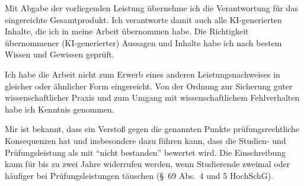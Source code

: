 {{Mit Abgabe der vorliegenden Leistung übernehme ich die Verantwortung für das eingereichte Gesamtprodukt. Ich verantworte damit auch alle KI-generierten Inhalte, die ich in meine Arbeit übernommen habe. Die Richtigkeit übernommener (KI-generierter) Aussagen und Inhalte habe ich nach bestem Wissen und Gewissen geprüft.
    
Ich habe die Arbeit nicht zum Erwerb eines anderen Leistungsnachweises in gleicher oder ähnlicher Form eingereicht. Von der Ordnung zur Sicherung guter wissenschaftlicher Praxis und zum Umgang mit wissenschaftlichem Fehlverhalten habe ich Kenntnis genommen.
    
Mir ist bekannt, dass ein Verstoß gegen die genannten Punkte prüfungsrechtliche Konsequenzen hat und insbesondere dazu führen kann, dass die Studien- und Prüfungsleistung als mit "`nicht bestanden"' bewertet wird. Die Einschreibung kann für bis zu zwei Jahre widerrufen werden, wenn Studierende zweimal oder häufiger bei Prüfungsleistungen täuschen (§~69 Abs.~4 und 5 HochSchG).
}}



